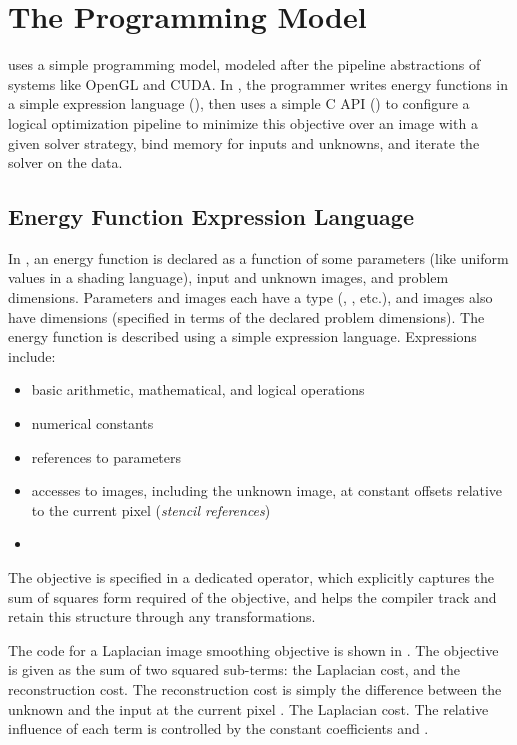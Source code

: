 \section{The \OPT{} Programming Model}
\label{sec:language}

\OPT{} uses a simple programming model, modeled after the pipeline abstractions of systems like OpenGL and CUDA. In \OPT, the programmer writes energy functions in a simple expression language (), then uses a simple C API () to configure a logical optimization pipeline to minimize this objective over an image with a given solver strategy, bind memory for inputs and unknowns, and iterate the solver on the data.
          
\subsection{Energy Function Expression Language} %
\label{sec:expression_language}

In \OPT, an energy function is declared as a function of some parameters (like uniform values in a shading language), input and unknown images, and problem dimensions. Parameters and images each have a type (, , etc.), and images also have dimensions (specified in terms of the declared problem dimensions).
The energy function is described using a simple expression language.
Expressions include:

\begin{itemize}
  \item basic arithmetic, mathematical, and logical operations
  \item numerical constants
  \item references to parameters
  \item accesses to images, including the unknown image, at constant offsets relative to the current pixel (\emph{stencil references})
  \item {}
\end{itemize}
%
The objective is specified in a dedicated  operator, which explicitly captures the sum of squares form required of the objective, and helps the compiler track and retain this structure through any transformations.

The \OPT code for a Laplacian image smoothing objective is shown in . The objective is given as the sum of two squared sub-terms: the Laplacian cost, and the reconstruction cost.
The reconstruction cost is simply the difference between the unknown  and the input  at the current pixel .
The Laplacian cost.
The relative influence of each term is controlled by the constant coefficients  and .

